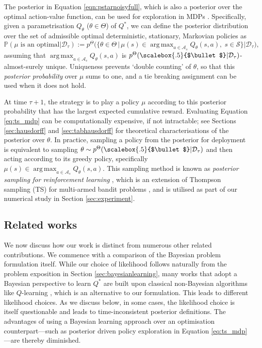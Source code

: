 \documentclass{amsart}
\renewcommand{\cdot}[1][.5]{%
  \mathbin{\vcenter{\hbox{\scalebox{#1}{$\bullet$}}}}%
}
\DeclareMathOperator*{\argmax}{arg\,max}
\begin{document}
The posterior in Equation \ref{eqn:pstarnoisyfull}, which is also a posterior over the optimal action-value function, can be used for exploration in MDPs \cite{tsstren}. Specifically, given a parametrisation $Q_\theta$ ($\theta\in\Theta$) of $Q^*$, we can define the posterior distribution over the set of admissible optimal deterministic, stationary, Markovian policies as
\begin{equation}\mathbb{P}(\mu \text{ is an optimal}| \mathcal{D}_\tau)
:=p^\Theta \bigg(
\bigg\{
\theta\in \Theta  \,\bigg|\,  \mu(s) \in \argmax_{a \in \mathcal{A}_s} Q_\theta(s,a), \; s \in \mathcal{S}
\bigg\} 
\bigg| \mathcal{D}_\tau 
\bigg),
\label{eq:ts_mdp}
\end{equation}
assuming that $\argmax_{a \in \mathcal{A}_s} Q_\theta(s,a)$ is $p^\Theta(\cdot|\mathcal{D}_\tau)$-almost-surely unique. Uniqueness prevents `double counting' of $\theta$, so that this \emph{posterior probability} over $\mu$ sums to one, and a tie breaking assignment can be used when it does not hold. 


At time $\tau +1$, the strategy is to play a policy $\mu$ according to this posterior probability that has the largest expected cumulative reward. Evaluating Equation \ref{eq:ts_mdp} can be computationally expensive, if not intractable; see Sections \ref{sec:hausdorff} and \ref{sec:tabhausdorff} for theoretical characterisations of the posterior over $\theta$. In practice, sampling a policy from the posterior for deployment is equivalent to sampling  $\theta \sim p^\Theta(\cdot|\mathcal{D}_{\tau})$ and then acting according to its greedy policy, specifically $\mu(s) \in \argmax_{a \in \mathcal{A}_s} Q_\theta(s,a)$.
This sampling method is known as  \textit{posterior sampling for reinforcement learning} \citep{tsstren,osband2013moreefficient}, which is an extension of Thompson sampling (TS) \citep{ts1933} for multi-armed bandit problems \citep{tstutorial}, and is utilised as part of our numerical study in Section \ref{sec:experiment}.




\subsection{Related works}\label{sec:relatedwork}

We now discuss how our work is distinct from numerous other related contributions. We commence with a comparison of the Bayesian problem formulation itself. While our choice of likelihood follows naturally from the problem exposition in Section \ref{sec:bayesianlearning}, many works that adopt a Bayesian perspective to learn $Q^*$ are built upon classical non-Bayesian algorithms like $Q$-learning \citep{qlearning1992,tsdeardenbayesq}, which is an alternative to our formulation. This leads to different likelihood choices. As we discuss below, in some cases, the likelihood choice is itself questionable and leads to time-inconsistent posterior definitions. The advantages of using a Bayesian learning approach over an optimisation counterpart---such as posterior driven policy exploration in Equation \ref{eq:ts_mdp}---are thereby diminished.
\end{document}
